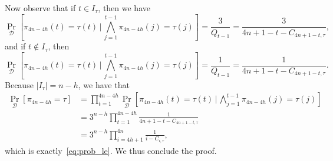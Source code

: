\documentclass[11pt]{amsart}
\begin{document}
Now observe that if $t \in I_\tau$, then we have
     \[
     \Pr_{\mathcal{D}}\left[\pi_{4n-4h}(t) = \tau(t) \, \Big|\, \bigwedge_{j=1}^{t-1 }\pi_{4n-4h}(j) = \tau(j)\right] = \frac{3}{Q_{t-1}} = \frac{3}{4n+1-t-C_{4n+1-t, \tau}},
   \]
   and if $t \not\in I_\tau$, then 
     \[
     \Pr_{\mathcal{D}}\left[\pi_{4n-4h}(t) = \tau(t) \, \Big|\, \bigwedge_{j=1}^{t-1 }\pi_{4n-4h}(j) = \tau(j)\right] = \frac{1}{Q_{t-1}} = \frac{1}{4n+1-t-C_{4n+1-t, \tau}}.
   \]
   Because $\left| I_\tau \right|= n-h$, we have that
    \begin{align*}
     \Pr_{\mathcal{D}}[\pi_{4n-4h} = \tau] &=  \prod_{t=1}^{4n-4h} \Pr_{\mathcal{D}}\left[\pi_{4n-4h}(t) = \tau(t) \, \Big|\, \bigwedge_{j=1}^{t-1 }\pi_{4n-4h}(j) = \tau(j)\right] \\ &= 3^{n-h} \prod_{t=1}^{4n-4h} \frac{1}{4n+1-t-C_{4n+1-t, \tau}} \\
     &= 3^{n-h} \prod_{i=4h+1}^{4n} \frac{1}{i-C_{i, \tau}},
    \end{align*}
which is exactly~\eqref{eq:prob_le}. We thus conclude the proof.
\end{document}
